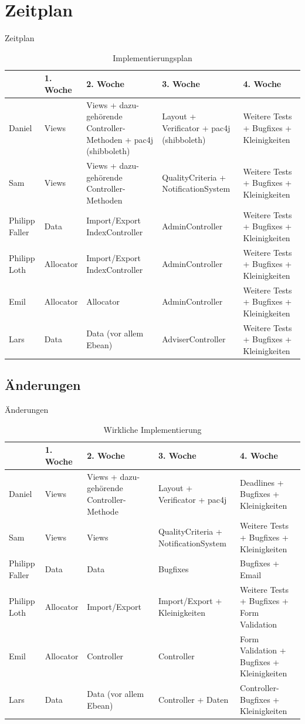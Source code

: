 \documentclass[18pt]{beamer}
\begin{document}
\section{Zeitplan}
\begin{frame}{Zeitplan}
\begin{table}[H]
\begin{tabularx}{\textwidth}{|l|l|X|X|X|}
\hline
 	& 1. Woche			& 2. Woche		& 3. Woche & 4. Woche\\
\hline 
Daniel	& Views			& Views + dazu-gehörende Controller-Methoden + pac4j 
(shibboleth) & Layout + Verificator
+ pac4j (shibboleth)& Weitere Tests +
Bugfixes +
Kleinigkeiten\\
\hline
Sam & Views&Views +
dazu-gehörende
Controller-
Methoden & QualityCriteria +
NotificationSystem & Weitere Tests +
Bugfixes +
Kleinigkeiten\\
\hline
Philipp Faller&Data&Import/Export
IndexController&AdminController&Weitere Tests +
Bugfixes +
Kleinigkeiten\\
\hline
Philipp Loth&Allocator&Import/Export
IndexController&AdminController&Weitere Tests +
Bugfixes +
Kleinigkeiten\\
\hline
Emil&Allocator&Allocator&AdminController&Weitere Tests +
Bugfixes +
Kleinigkeiten\\
\hline
Lars&Data&Data (vor allem
Ebean)&AdviserController&Weitere Tests +
Bugfixes +
Kleinigkeiten\\
\hline
\end{tabularx}
\caption{Implementierungsplan}
\end{table}
\end{frame}

\subsection{Änderungen}
\begin{frame}{Änderungen}
\begin{table}[H]
\begin{tabularx}{\textwidth}{|l|l|X|X|X|}
\hline
 	& 1. Woche			& 2. Woche		& 3. Woche & 4. Woche\\
\hline 
Daniel	& Views			& Views + dazu-gehörende Controller-Methode & Layout + Verificator
+ pac4j&Deadlines + Bugfixes +
Kleinigkeiten \\
\hline
Sam & Views&Views& QualityCriteria +
NotificationSystem & Weitere Tests +
Bugfixes +
Kleinigkeiten\\
\hline
Philipp Faller&Data&Data&Bugfixes&Bugfixes +  Email\\
\hline
Philipp Loth&Allocator&Import/Export
&Import/Export + Kleinigkeiten &Weitere Tests +
Bugfixes +
Form Validation\\
\hline
Emil&Allocator&Controller&Controller&Form Validation +
Bugfixes +
Kleinigkeiten\\
\hline
Lars&Data&Data (vor allem
Ebean)&Controller + Daten &
Controller-Bugfixes +
Kleinigkeiten\\
\hline
\end{tabularx}
\caption{Wirkliche Implementierung}
\end{table}
\end{frame}
\end{document}
